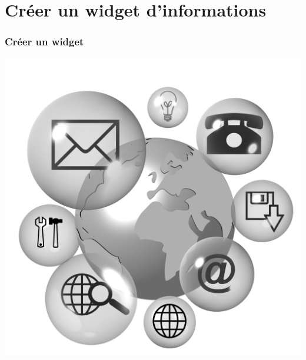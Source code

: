 \documentclass{beamer}
\begin{document}
\section{Créer un widget d'informations}
\begin{frame}
\frametitle{Créer un widget}
\begin{center}
\includegraphics[scale=0.4]{infos.jpg}
\end{center}
\end{frame}
\end{document}
